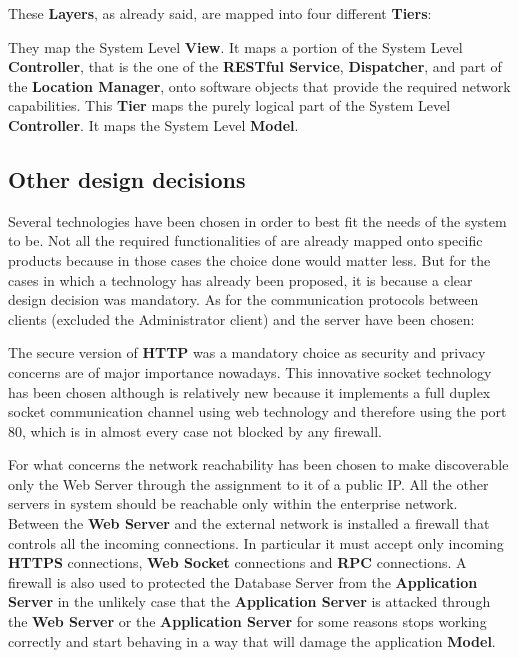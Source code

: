 These \textbf{Layers}, as already said, are mapped into four different \textbf{Tiers}:
\begin{itemize}
	 They map the System Level \textbf{View}.
	 It maps a portion of the System Level \textbf{Controller}, that is the one of the \textbf{RESTful Service}, \textbf{Dispatcher}, and part of the \textbf{Location Manager}, onto software objects that provide the required network capabilities.
	 This \textbf{Tier} maps the purely logical part of the System Level \textbf{Controller}.
	 It maps the System Level \textbf{Model}.
\end{itemize}

\subsection{Other design decisions}
Several technologies have been chosen in order to best fit the needs of the system to be.
Not all the required functionalities of \myTaxiService{} are already mapped onto specific products because in those cases the choice done would matter less.
But for the cases in which a technology has already been proposed, it is because a clear design decision was mandatory.
As for the communication protocols between clients (excluded the Administrator client) and the server have been chosen:
\begin{itemize}
	 The secure version of \textbf{HTTP} was a mandatory choice as security and privacy concerns are of major importance nowadays.
	 This innovative socket technology has been chosen although is relatively new because it implements a full duplex socket communication channel using web technology and therefore using the port 80, which is in almost every case not blocked by any firewall.
\end{itemize}
For what concerns the network reachability has been chosen to make discoverable only the Web Server through the assignment to it of a public IP.
All the other servers in \myTaxiService{} system should be reachable only within the enterprise network.
Between the \textbf{Web Server} and the external network is installed a firewall that controls all the incoming connections.
In particular it must accept only incoming \textbf{HTTPS} connections, \textbf{Web Socket} connections and \textbf{RPC} connections.
A firewall is also used to protected the Database Server from the \textbf{Application Server} in the unlikely case that the \textbf{Application Server} is attacked through the \textbf{Web Server} or the \textbf{Application Server} for some reasons stops working correctly and start behaving in a way that will damage the application \textbf{Model}.
